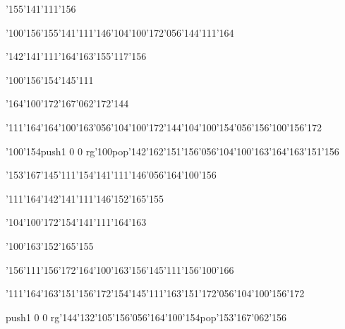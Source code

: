 \null\vfill\ipa\centerline{\enskip\enskip\enskip\enskip\enskip\enskip\enskip\enskip\enskip\enskip\enskip\char'155\char'141\char'111\char'156\enskip\enskip\enskip\enskip}\medskip\centerline{\enskip\char'100\char'156\enskip\char'155\char'141\char'111\char'146\enskip\char'104\char'100\char'172\char'056\char'144\char'111\char'164}\medskip\centerline{\enskip\enskip\enskip\enskip\enskip\enskip\char'142\char'141\char'111\char'164\char'163\enskip\enskip\enskip\enskip\char'155\char'117\char'156}\medskip\centerline{\enskip\char'100\char'156\enskip\char'154\char'145\char'111\enskip\enskip\enskip\enskip\enskip\enskip\enskip}\medskip\centerline{\enskip\char'164\char'100\char'172\enskip\char'167\char'062\char'172\char'144\enskip\enskip\enskip\enskip\enskip\enskip\enskip\enskip\enskip\enskip\enskip\enskip\enskip\enskip\enskip}\medskip\centerline{\enskip\char'111\char'164\enskip\char'164\char'100\char'163\char'056\char'104\char'100\char'172\char'144\enskip\enskip\enskip\enskip\enskip\char'104\char'100\char'154\char'056\char'156\char'100\char'156\char'172}\medskip\centerline{\enskip\enskip\enskip\enskip\enskip\char'100\char'154\enskip\enskip\enskip\enskip\pdfcolorstack\match push{1 0 0 rg}\char'100\pdfcolorstack\match pop{}\enskip\char'142\char'162\char'151\char'156\char'056\char'104\char'100\char'163\enskip\char'164\char'163\char'151\char'156}\medskip\vfill\footline{\hfil\tt\folio\hfil}\eject
\null\vfill\ipa\centerline{\enskip\enskip\enskip\enskip\char'153\char'167\char'145\char'111\enskip\enskip\enskip\enskip\char'154\char'141\char'111\char'146\char'056\char'164\char'100\char'156}\medskip\centerline{\enskip\char'111\char'164\enskip\char'142\char'141\char'111\char'146\enskip\char'152\char'165\char'155\enskip\enskip\enskip\enskip}\medskip\centerline{\enskip\enskip\char'104\char'100\char'172\enskip\enskip\char'154\char'141\char'111\char'164\char'163\enskip\enskip\enskip\enskip\enskip\enskip\enskip}\medskip\centerline{\enskip\char'100\char'163\enskip\enskip\enskip\enskip\enskip\enskip\enskip\enskip\char'152\char'165\char'155}\medskip\centerline{\enskip\enskip\enskip\enskip\enskip\char'156\char'111\char'156\char'172\enskip\enskip\char'164\char'100\char'163\enskip\char'156\char'145\char'111\enskip\enskip\enskip\char'156\char'100\char'166}\medskip\centerline{\enskip\char'111\char'164\enskip\enskip\enskip\enskip\char'163\char'151\char'156\char'172\enskip\char'154\char'145\char'111\enskip\char'163\char'151\char'172\char'056\char'104\char'100\char'156\char'172}\medskip\centerline{\enskip\enskip\enskip\enskip\enskip\enskip\enskip\enskip\enskip\enskip\enskip\enskip\enskip\pdfcolorstack\match push{1 0 0 rg}\char'144\char'132\char'105\char'156\char'056\char'164\char'100\char'154\pdfcolorstack\match pop{}\enskip\char'153\char'167\char'062\char'156}\medskip\vfill\footline{\hfil\tt\folio\hfil}\eject\bye
